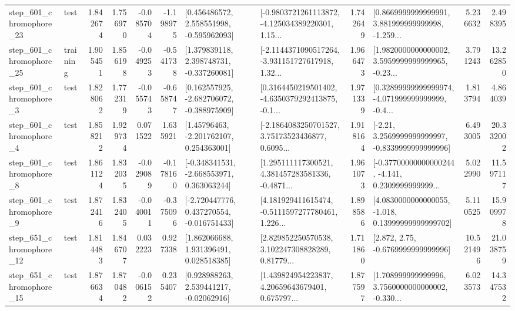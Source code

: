 \begin{tabular}{llrrrrllrlrr}
  step\_601\_chromophore\_23 &      test &      1.842674 &    1.756970 &     -0.085704 & -1.198975 &    [0.456486572, 2.558551998, -0.595962093] &  [-0.9803721261113872, -4.125034389220301, 1.15... &       1.742649 &  [0.8669999999999991, 3.881999999999998, -1.259... &            5.236632 &          2.498395 \\
  step\_601\_chromophore\_25 &  training &      1.905451 &    1.856198 &     -0.049253 & -0.541738 &    [1.379839118, 2.398748731, -0.337260081] &  [-2.1144371090517264, -3.931151727617918, 1.32... &       1.966473 &  [1.9820000000000002, 3.5959999999999965, -0.23... &            3.791243 &         13.262850 \\
   step\_601\_chromophore\_3 &      test &      1.828062 &    1.772319 &     -0.055743 & -0.658747 &   [0.162557925, -2.682706072, -0.388975909] &  [0.3164450219501402, -4.6350379292413875, -0.1... &       1.971339 &  [0.32899999999999974, -4.071999999999999, -0.4... &            1.813794 &          4.864039 \\
   step\_601\_chromophore\_4 &      test &      1.858212 &    1.929734 &      0.071522 &  1.635921 &     [1.45796463, -2.201762107, 0.254363001] &  [-2.1864083250701527, 3.75173523436877, 0.6095... &       1.918164 &   [-2.21, 3.2569999999999997, -0.8339999999999996] &            6.493005 &         20.332002 \\
   step\_601\_chromophore\_8 &      test &      1.861124 &    1.832035 &     -0.029089 & -0.178160 &   [-0.348341531, -2.668553971, 0.363063244] &  [1.295111117300521, 4.381457283581336, -0.4871... &       1.961073 &  [-0.37700000000000244, -4.141, 0.2309999999999... &            5.022990 &         11.597117 \\
   step\_601\_chromophore\_9 &      test &      1.872416 &    1.832405 &     -0.040011 & -0.375096 &   [-2.720447776, 0.437270554, -0.016751433] &  [4.181929411615474, -0.5111597277780461, 1.226... &       1.898586 &  [4.0830000000000055, -1.018, 0.13999999999999702] &            5.110525 &         15.909978 \\
  step\_651\_chromophore\_12 &      test &      1.814483 &    1.846707 &      0.032223 &  0.927338 &     [1.862066688, 1.931396491, 0.028518385] &  [2.829852250570538, 3.102247308828289, 0.81779... &       1.711860 &                 [2.872, 2.75, -0.6769999999999996] &           10.521496 &         21.038759 \\
  step\_651\_chromophore\_15 &      test &      1.876634 &    1.870482 &     -0.006152 &  0.235407 &     [0.928988263, 2.539441217, -0.02062916] &  [1.439824954223837, 4.20659643679401, 0.675797... &       1.877597 &  [1.708999999999996, 3.7560000000000002, -0.330... &            6.023573 &         14.347532 \\

\end{tabular}
